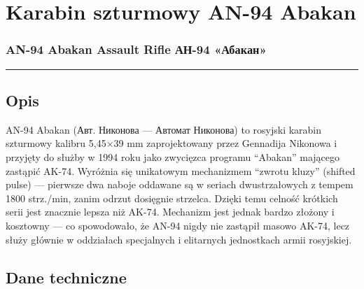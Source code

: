 \documentclass[12pt,openany,oneside]{book}
\begin{document}
\chapter{Karabin szturmowy AN-94
Abakan}\label{karabin-szturmowy-an-94-abakan}

\subsection{AN-94 Abakan Assault Rifle \textbar{} АН-94
«Абакан»}\label{an-94-abakan-assault-rifle-ux430ux43d-94-ux430ux431ux430ux43aux430ux43d}

\begin{center}\rule{0.5\linewidth}{0.5pt}\end{center}

\section{Opis}\label{opis-50}

AN-94 Abakan (Авт. Никонова --- Автомат Никонова) to rosyjski karabin
szturmowy kalibru 5,45×39 mm zaprojektowany przez Gennadija Nikonowa i
przyjęty do służby w 1994 roku jako zwycięzca programu ``Abakan''
mającego zastąpić AK-74. Wyróżnia się unikatowym mechanizmem ``zwrotu
kluzy'' (shifted pulse) --- pierwsze dwa naboje oddawane są w seriach
dwustrzałowych z tempem 1800 strz./min, zanim odrzut dosięgnie strzelca.
Dzięki temu celność krótkich serii jest znacznie lepsza niż AK-74.
Mechanizm jest jednak bardzo złożony i kosztowny --- co spowodowało, że
AN-94 nigdy nie zastąpił masowo AK-74, lecz służy głównie w oddziałach
specjalnych i elitarnych jednostkach armii rosyjskiej.

\section{Dane techniczne}\label{dane-techniczne-50}
\end{document}
